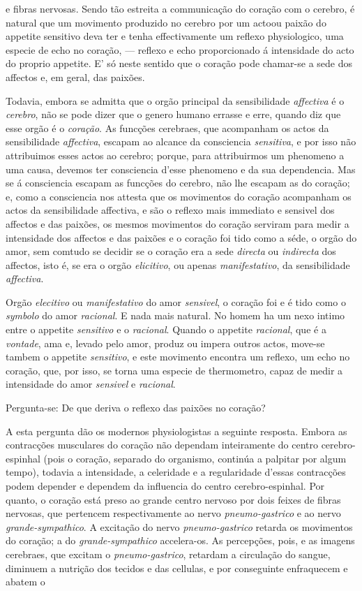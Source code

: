 e fibras nervosas. Sendo tão estreita a communicação do coração com o cerebro, é natural que um movimento produzido no cerebro por um actoou paixão do appetite sensitivo deva ter e tenha effectivamente um reflexo physiologico, uma especie de echo no coração, --- reflexo e echo proporcionado á intensidade do acto do proprio appetite. E' só neste sentido que o coração pode chamar-se a sede dos affectos e, em geral, das paixões.\par Todavia, embora se admitta que o orgão principal da sensibilidade \emph{affectiva} é o \emph{cerebro}, não se pode dizer que o genero humano errasse e erre, quando diz que esse orgão é o \emph{coração}. As funcções cerebraes, que acompanham os actos da sensibilidade \emph{affectiva}, escapam ao alcance da consciencia \emph{sensitiva}, e por isso não attribuimos esses actos ao cerebro; porque, para attribuirmos um phenomeno a uma causa, devemos ter consciencia d'esse phenomeno e da sua dependencia. Mas se á consciencia escapam as funcções do cerebro, não lhe escapam as do coração; e, como a consciencia nos attesta que os movimentos do coração acompanham os actos da sensibilidade affectiva, e são o reflexo mais immediato e sensivel dos affectos e das paixões, os mesmos movimentos do coração serviram para medir a intensidade dos affectos e das paixões e o coração foi tido como a séde, o orgão do amor, sem comtudo se decidir se o coração era a sede \emph{directa} ou \emph{indirecta} dos affectos, isto é, se era o orgão \emph{elicitivo}, ou apenas \emph{manifestativo}, da sensibilidade \emph{affectiva}.\par Orgão \emph{elecitivo} ou \emph{manifestativo} do amor \emph{sensivel}, o coração foi e é tido como o \emph{symbolo} do amor \emph{racional}. E nada mais natural. No homem ha um nexo intimo entre o appetite \emph{sensitivo} e o \emph{racional}. Quando o appetite \emph{racional}, que é a \emph{vontade}, ama e, levado pelo amor, produz ou impera outros actos, move-se tambem o appetite \emph{sensitivo}, e este movimento encontra um reflexo, um echo no coração, que, por isso, se torna uma especie de thermometro, capaz de medir a intensidade do amor \emph{sensivel} e \emph{racional}.\par Pergunta-se: De que deriva o reflexo das paixões no coração?\par A esta pergunta dão os modernos physiologistas a seguinte resposta. Embora as contracções musculares do coração não dependam inteiramente do centro cerebro-espinhal (pois o coração, separado do organismo, continúa a palpitar por algum tempo), todavia a intensidade, a celeridade e a regularidade d'essas contracções podem depender e dependem da influencia do centro cerebro-espinhal. Por quanto, o coração está preso ao grande centro nervoso por dois feixes de fibras nervosas, que pertencem respectivamente ao nervo \emph{pneumo-gastrico} e ao nervo \emph{grande-sympathico}. A excitação do nervo \emph{pneumo-gastrico} retarda os movimentos do coração; a do \emph{grande-sympathico} accelera-os. As percepções, pois, e as imagens cerebraes, que excitam o \emph{pneumo-gastrico}, retardam a circulação do sangue, diminuem a nutrição dos tecidos e das cellulas, e por conseguinte enfraquecem e abatem o 